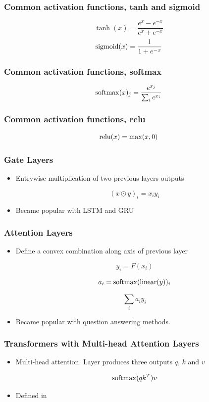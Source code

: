 \documentclass{beamer}
\begin{document}
\frame
{
   \frametitle{Common activation functions, tanh and sigmoid}

   $$\tanh(x) = \frac{e^x - e^{-x}}{e^x + e^{-x}}$$
   $$\operatorname{sigmoid}(x) = \frac{1}{1 + e^{-x}}$$
}


\frame
{
   \frametitle{Common activation functions, softmax}

   $$\operatorname{softmax}(x)_j = \frac{e^{x_j}}{\sum_i e^{x_i}}$$
}

\frame
{
   \frametitle{Common activation functions, relu}

   $$\operatorname{relu}(x) = \max(x, 0)$$
}

\frame
{
   \frametitle{Gate Layers}

   \begin{itemize}
      \item<1-> Entrywise multiplication of two previous layers outputs

      $$(x \odot y)_i = x_i y_i$$

      \item<2-> Became popular with LSTM and GRU
      
   \end{itemize}
}

\frame
{
   \frametitle{Attention Layers}

   \begin{itemize}
      \item<1-> Define a convex combination along axis of previous layer

      $$y_i = F(x_i)$$

      $$a_i = \operatorname{softmax}(\operatorname{linear}(y))_i$$

      $$\sum_i a_i y_i$$

      \item<2-> Became popular with question answering methods.
      
   \end{itemize}
}

\frame
{
   \frametitle{Transformers with Multi-head Attention Layers}

   \begin{itemize}
      \item<1-> Multi-head attention. Layer produces three outputs $q$, $k$ and $v$

      $$\operatorname{softmax} ({qk^T}) v$$

      \item<2-> Defined in \cite{vaswani2017attention}
      
   \end{itemize}
}
\end{document}
